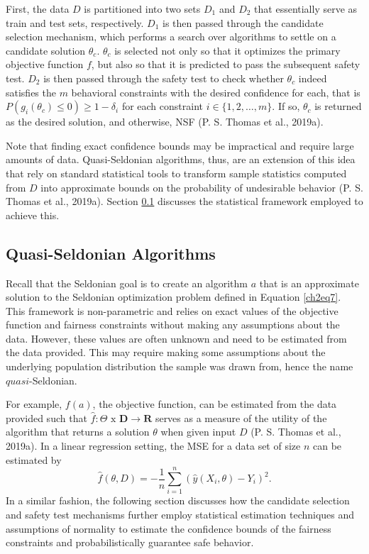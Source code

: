 \documentclass[12pt, twoside]{amherstthesis}
\begin{document}
First, the data \(D\) is partitioned into two sets \(D_1\) and \(D_2\) that essentially serve as train and test sets, respectively. \(D_1\) is then passed through the candidate selection mechanism, which performs a search over algorithms to settle on a candidate solution \(\theta_c\). \(\theta_c\) is selected not only so that it optimizes the primary objective function \(f\), but also so that it is predicted to pass the subsequent safety test. \(D_2\) is then passed through the safety test to check whether \(\theta_c\) indeed satisfies the \(m\) behavioral constraints with the desired confidence for each, that is \(P(g_i(\theta_c) \leq 0) \geq 1 - \delta_i\) for each constraint \(i \in \{ 1,2, \ldots, m \}\). If so, \(\theta_c\) is returned as the desired solution, and otherwise, NSF (P. S. Thomas et al., 2019a).

Note that finding exact confidence bounds may be impractical and require large amounts of data. Quasi-Seldonian algorithms, thus, are an extension of this idea that rely on standard statistical tools to transform sample statistics computed from \(D\) into approximate bounds on the probability of undesirable behavior (P. S. Thomas et al., 2019a). Section \ref{qsa} discusses the statistical framework employed to achieve this.

\hypertarget{qsa}{%
\subsection{Quasi-Seldonian Algorithms}\label{qsa}}

Recall that the Seldonian goal is to create an algorithm \(a\) that is an approximate solution to the Seldonian optimization problem defined in Equation \ref{ch2eq7}. This framework is non-parametric and relies on exact values of the objective function and fairness constraints without making any assumptions about the data. However, these values are often unknown and need to be estimated from the data provided. This may require making some assumptions about the underlying population distribution the sample was drawn from, hence the name \(\textit{quasi}\)-Seldonian.

For example, \(f(a)\), the objective function, can be estimated from the data provided such that \(\hat{f}: \Theta \text{ x } \textbf{D} \rightarrow \textbf{R}\) serves as a measure of the utility of the algorithm that returns a solution \(\theta\) when given input \(D\) (P. S. Thomas et al., 2019a). In a linear regression setting, the MSE for a data set of size \(n\) can be estimated by
\begin{equation}
\label{ch2eq9}
\hat{f}(\theta, D) = -\frac{1}{n} \sum_{i=1}^{n}(\hat{y}(X_i, \theta) - Y_i)^2.
\end{equation}
In a similar fashion, the following section discusses how the candidate selection and safety test mechanisms further employ statistical estimation techniques and assumptions of normality to estimate the confidence bounds of the fairness constraints and probabilistically guarantee safe behavior.
\end{document}
